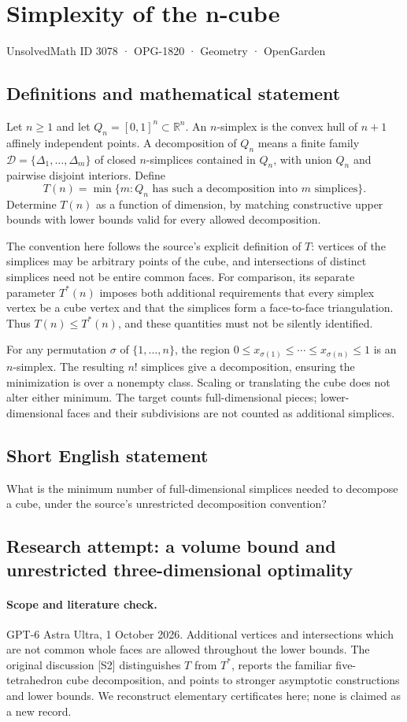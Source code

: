 \documentclass[11pt,a4paper]{article}
\begin{document}
\section*{Simplexity of the n-cube}\label{3078}
{\small UnsolvedMath ID 3078 · OPG-1820 · Geometry · OpenGarden}
\subsection{Definitions and mathematical statement}
Let $n\ge1$ and let $Q_n=[0,1]^n\subset\mathbb R^n$.
An $n$-simplex is the convex hull of $n+1$ affinely independent points.
A decomposition of $Q_n$ means a finite family
$\mathcal D=\{\Delta_1,\ldots,\Delta_m\}$ of closed $n$-simplices
contained in $Q_n$, with union $Q_n$ and pairwise disjoint interiors.
Define
\[
 T(n)=\min\{m:Q_n\text{ has such a decomposition into }m\text{ simplices}\}.
\]
Determine $T(n)$ as a function of dimension, by matching constructive
upper bounds with lower bounds valid for every allowed decomposition.

The convention here follows the source's explicit definition of $T$:
vertices of the simplices may be arbitrary points of the cube, and
intersections of distinct simplices need not be entire common faces.
For comparison, its separate parameter $T^*(n)$ imposes both additional
requirements that every simplex vertex be a cube vertex and that the
simplices form a face-to-face triangulation. Thus $T(n)\le T^*(n)$, and
these quantities must not be silently identified.

For any permutation $\sigma$ of $\{1,\ldots,n\}$, the region
$0\le x_{\sigma(1)}\le\cdots\le x_{\sigma(n)}\le1$ is an $n$-simplex.
The resulting $n!$ simplices give a decomposition, ensuring the minimization
is over a nonempty class. Scaling or translating the cube does not
alter either minimum. The target counts full-dimensional pieces; lower-dimensional
faces and their subdivisions are not counted as additional simplices.
\subsection{Short English statement}
What is the minimum number of full-dimensional simplices needed to decompose a cube, under the source’s unrestricted decomposition convention?
\subsection{Research attempt: a volume bound and unrestricted three-dimensional optimality}
\paragraph{Scope and literature check.}
GPT-6 Astra Ultra, 1 October 2026. Additional vertices and intersections
which are not common whole faces are allowed throughout the lower
bounds. The original discussion [S2] distinguishes $T$ from $T^*$,
reports the familiar five-tetrahedron cube decomposition, and points to
stronger asymptotic constructions and lower bounds. We reconstruct
elementary certificates here; none is claimed as a new record.
\end{document}
